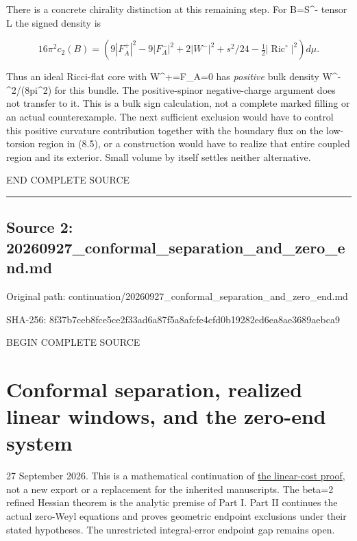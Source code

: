 \documentclass[
  10pt,
]{article}
\begin{document}
There is a concrete chirality distinction at this remaining step. For
B=S\^{}- tensor L the signed density is

\[
 16\pi^2c_2(B)=
 \left(9|F_A^+|^2-9|F_A^-|^2
       +2|W^-|^2+s^2/24-\tfrac12|\operatorname{Ric}^{\circ}|^2\right)d\mu.
                                                               \tag{8.12}
\]

Thus an ideal Ricci-flat core with W\^{}+=F\_A=0 has \emph{positive}
bulk density \textbar W\^{}-\textbar\^{}2/(8pi\^{}2) for this bundle.
The positive-spinor negative-charge argument does not transfer to it.
This is a bulk sign calculation, not a complete marked filling or an
actual counterexample. The next sufficient exclusion would have to
control this positive curvature contribution together with the boundary
flux on the low-torsion region in (8.5), or a construction would have to
realize that entire coupled region and its exterior. Small volume by
itself settles neither alternative.

END COMPLETE SOURCE

\begin{center}\rule{0.5\linewidth}{0.5pt}\end{center}

\hypertarget{source-2-20260927_conformal_separation_and_zero_end.md}{%
\subsection{Source 2:
20260927\_conformal\_separation\_and\_zero\_end.md}\label{source-2-20260927_conformal_separation_and_zero_end.md}}

Original path:
continuation/20260927\_conformal\_separation\_and\_zero\_end.md

SHA-256:
8f37b7ceb8fce5ce2f33ad6a87f5a8afcfe4cfd0b19282ed6ea8ae3689aebca9

BEGIN COMPLETE SOURCE

\hypertarget{conformal-separation-realized-linear-windows-and-the-zero-end-system}{%
\section{Conformal separation, realized linear windows, and the zero-end
system}\label{conformal-separation-realized-linear-windows-and-the-zero-end-system}}

27 September 2026. This is a mathematical continuation of
\href{20260927_mixed_current_and_signed_cores.md}{the linear-cost
proof}, not a new export or a replacement for the inherited manuscripts.
The beta=2 refined Hessian theorem is the analytic premise of Part I.
Part II continues the actual zero-Weyl equations and proves geometric
endpoint exclusions under their stated hypotheses. The unrestricted
integral-error endpoint gap remains open.
\end{document}
